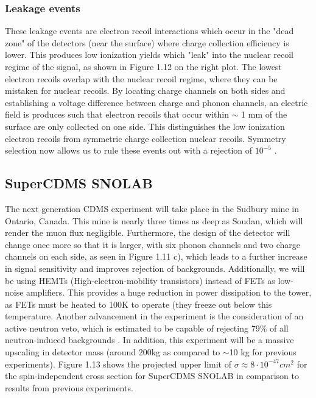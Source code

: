 \documentclass{report}
\begin{document}
\subsubsection{Leakage events}

These leakage events are electron recoil interactions which occur in the "dead zone" of the detectors (near the surface) where charge collection efficiency is lower. This produces low ionization yields which "leak" into the nuclear recoil regime of the signal, as shown in Figure 1.12 on the right plot. The lowest electron recoils overlap with the nuclear recoil regime, where they can be mistaken for nuclear recoils. By locating charge channels on both sides and establishing a voltage difference between charge and phonon channels, an electric field is produces such that electron recoils that occur within $\sim$ 1 mm of the surface are only collected on one side. This distinguishes the low ionization electron recoils from symmetric charge collection nuclear recoils. Symmetry selection now allows us to rule these events out with a rejection of $10^{-5}$ \cite{Saab2012}.

\subsection{SuperCDMS SNOLAB}

The next generation CDMS experiment will take place in the Sudbury mine in Ontario, Canada. This mine is nearly three times as deep as Soudan, which will render the muon flux negligible. Furthermore, the design of the detector will change once more so that it is larger, with six phonon channels and two charge channels on each side, as seen in Figure 1.11 c), which leads to a further increase in signal sensitivity and improves rejection of backgrounds. Additionally, we will be using HEMTs (High-electron-mobility transistors) instead of FETs as low-noise amplifiers. This provides a huge reduction in power dissipation to the tower, as FETs must be heated to 100K to operate (they freeze out below this temperature. Another advancement in the experiment is the consideration of an active neutron veto, which is estimated to be capable of rejecting 79\% of all neutron-induced backgrounds \cite{DOE}. In addition, this experiment will be a massive upscaling in detector mass (around 200kg as compared to $\sim$10 kg for previous experiments). Figure 1.13 shows the projected upper limit of $\sigma \approx 8 \cdot 10^{-47} cm^2$ for the spin-independent cross section for SuperCDMS SNOLAB in comparison to results from previous experiments.
\end{document}
